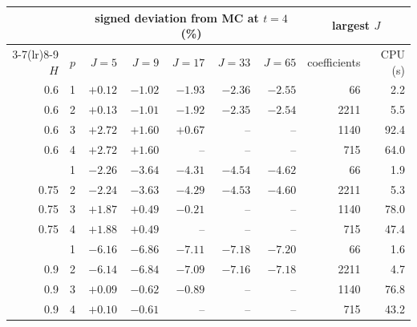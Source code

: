 \begin{tabular}{rrrrrrrrr}\toprule
 & & \multicolumn{5}{c}{signed deviation from MC at $t=4$ (\%)} & \multicolumn{2}{c}{largest $J$}\\\cmidrule(lr){3-7}\cmidrule(lr){8-9}
$H$ & $p$ & $J=5$ & $J=9$ & $J=17$ & $J=33$ & $J=65$ & coefficients & CPU (s)\\\midrule
0.6 & 1 & $+0.12$ & $-1.02$ & $-1.93$ & $-2.36$ & $-2.55$ & 66 & 2.2\\
0.6 & 2 & $+0.13$ & $-1.01$ & $-1.92$ & $-2.35$ & $-2.54$ & 2211 & 5.5\\
0.6 & 3 & $+2.72$ & $+1.60$ & $+0.67$ & -- & -- & 1140 & 92.4\\
0.6 & 4 & $+2.72$ & $+1.60$ & -- & -- & -- & 715 & 64.0\\
\addlinespace
0.75 & 1 & $-2.26$ & $-3.64$ & $-4.31$ & $-4.54$ & $-4.62$ & 66 & 1.9\\
0.75 & 2 & $-2.24$ & $-3.63$ & $-4.29$ & $-4.53$ & $-4.60$ & 2211 & 5.3\\
0.75 & 3 & $+1.87$ & $+0.49$ & $-0.21$ & -- & -- & 1140 & 78.0\\
0.75 & 4 & $+1.88$ & $+0.49$ & -- & -- & -- & 715 & 47.4\\
\addlinespace
0.9 & 1 & $-6.16$ & $-6.86$ & $-7.11$ & $-7.18$ & $-7.20$ & 66 & 1.6\\
0.9 & 2 & $-6.14$ & $-6.84$ & $-7.09$ & $-7.16$ & $-7.18$ & 2211 & 4.7\\
0.9 & 3 & $+0.09$ & $-0.62$ & $-0.89$ & -- & -- & 1140 & 76.8\\
0.9 & 4 & $+0.10$ & $-0.61$ & -- & -- & -- & 715 & 43.2\\
\bottomrule\end{tabular}
